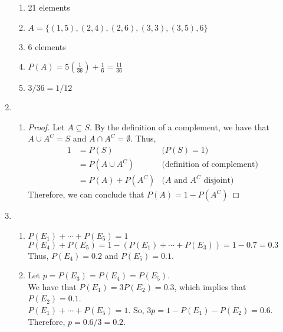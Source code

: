 \documentclass[12pt,reqno]{article}
\theoremstyle{plain}
\theoremstyle{definition}
\begin{document}
\begin{enumerate}
\begin{enumerate}
        \item 21 elements
        \item \(A = \{(1,5),(2,4),(2,6),(3,3),(3,5),6\}\)
        \item 6 elements
        \item \(P(A) = 5(\frac{1}{36}) + \frac{1}{6} = \frac{11}{36}\)
        \item \(3/36 = 1/12\) \bigskip
    \end{enumerate}
    \item \begin{enumerate}
        \item \begin{proof}
            Let \(A\subseteq S\). By the definition of a complement, we have that \(A\cup A^C=S\)
            and \(A\cap A^C=\emptyset\). Thus,
            \begin{align*}
               1 &= P(S) & \text{(\(P(S)=1\))}\\
               &= P(A\cup A^C) & \text{(definition of complement)}\\
               &=P(A)+P(A^C) & \text{(\(A\) and \(A^C\) disjoint)}
            \end{align*}
            Therefore, we can conclude that \(P(A)=1-P(A^C)\)
        \end{proof}
    \end{enumerate} \bigskip
    \item \begin{enumerate}
        \item \(P(E_1)+\cdots+P(E_5)=1\)\\
        \(P(E_4)+P(E_5)=1-(P(E_1)+\cdots+P(E_3))=1-0.7=0.3\)\\
        Thus, \(P(E_4)=0.2\) and \(P(E_5)=0.1\).
        \item Let $p=P(E_3)=P(E_4)=P(E_5)$.\\
        We have that $P(E_1) = 3P(E_2)=0.3$, which implies that $P(E_2)=0.1$.\\
        $P(E_1)+\cdots+P(E_5)=1$. So, $3p=1-P(E_1)-P(E_2)=0.6.$\\
        Therefore, \(p=0.6 / 3=0.2\).
    \end{enumerate}
\end{enumerate}
\end{document}
